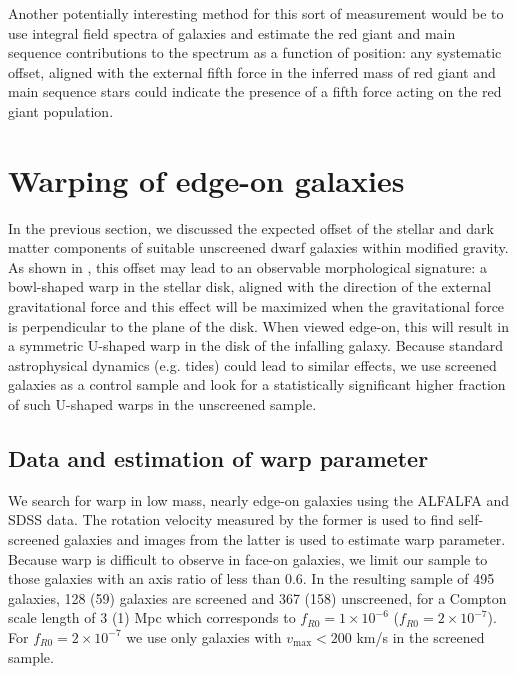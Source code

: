 \documentclass[useAMS,usenatbib,twocolumn]{mn2e}
\newcommand{\jakesays}[1]{{\color{red}[Jake says: #1]}}
\newcommand{\vinusays}[1]{{\color{blue}[Vinu says: #1]}}
\begin{document}
Another potentially interesting method 
for this sort of measurement would be to use integral field
spectra of galaxies and estimate the red giant and main sequence contributions
to the spectrum as a function of position: any systematic offset, aligned with
the external fifth force in the inferred mass of red giant and main sequence
stars could indicate the presence of a fifth force acting on the red giant
population.




\section{Warping of edge-on galaxies}
\label{sec:warp}

In the previous section, we discussed the expected offset of the stellar
and dark matter components of suitable unscreened dwarf galaxies within
modified gravity.  As shown in \citet{bhuvjake2011}, this offset may lead
to an observable morphological signature: a bowl-shaped warp in the stellar
disk, aligned with the direction of the external gravitational force and this
effect will be maximized when the gravitational
force is perpendicular to the plane of the disk. When viewed edge-on,
this will result in a symmetric U-shaped warp in the disk of the infalling
galaxy.  Because standard astrophysical dynamics (e.g. tides) could lead to
similar effects, we use screened galaxies as a control sample and look for
a statistically significant higher fraction of such U-shaped warps in the
unscreened sample.

\subsection{Data and estimation of warp parameter}
We search for warp in low mass, nearly edge-on galaxies using the
ALFALFA and SDSS data. The rotation velocity measured by the former is used to
find self-screened galaxies and images from the latter is used to estimate warp
parameter. Because warp is difficult to observe in face-on
galaxies, we limit our sample to those galaxies with an axis ratio
of less than 0.6. In the resulting sample of 495 galaxies, 128 (59) 
galaxies are screened and 367 (158) unscreened, for a Compton scale length of 3
(1) Mpc which corresponds to $f_{R0}=1 \times 10^{-6}$ ($f_{R0}=2 \times
10^{-7}$). For $f_{R0}=2 \times 10^{-7}$ we use only galaxies with
$v_\mathrm{max} < 200$ km/s in the screened sample.
\end{document}
